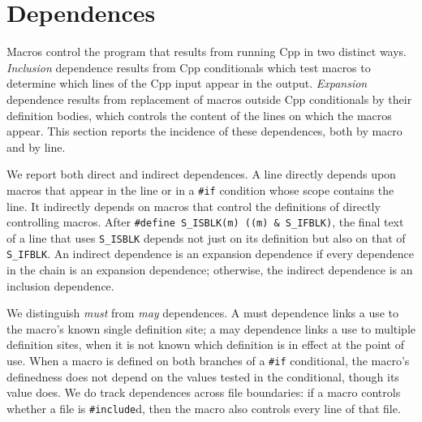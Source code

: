 \documentclass[10pt]{article}
\begin{document}
\section{Dependences}
\label{sec:dependence}
\label{sec:last-content-section}

Macros control the program that results from running Cpp in two distinct
ways.  \emph{Inclusion} dependence results from Cpp conditionals which test
macros to determine which
lines of the Cpp input appear in the output.  \emph{Expansion} dependence
results from replacement of macros outside Cpp conditionals by their
definition bodies, which controls the content of the lines on which the
macros appear.  This section reports the incidence of these dependences,
both by macro and by line.

We report both direct and indirect dependences.  A line directly depends
upon macros that appear in the line or in a {\tt \#if} condition whose
scope contains the line.  It indirectly depends on macros that control the
definitions of directly controlling macros.  After {\tt \#define
\verb|S_ISBLK|(m) ((m)~\&~\verb|S_IFBLK|)}, the final text of a line that
uses \verb|S_ISBLK| depends not just on its definition but also on that of
\verb|S_IFBLK|.  An indirect dependence is an expansion dependence if every
dependence in the chain is an expansion dependence; otherwise, the indirect
dependence is an inclusion dependence.

We distinguish \emph{must} from \emph{may} dependences.  A must dependence links a use
to the macro's known single definition site; a may dependence links a use
to multiple definition sites, when it is not known which definition is in
effect at the point of use.  When a macro is defined on both branches of a
{\tt \#if} conditional, the macro's definedness does not depend on the
values tested in the conditional, though its value does.  We do track
dependences across file boundaries: if a macro controls whether a file is
{\tt \#include}d, then the macro also controls every line of that file.

\end{document}
